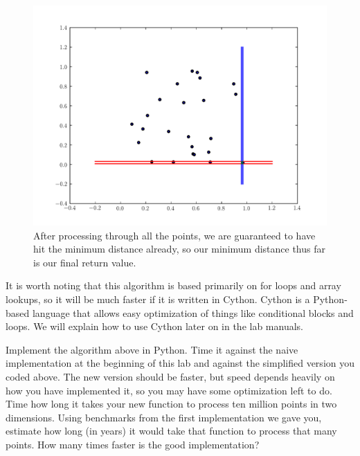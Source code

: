\begin{figure}[H]
\includegraphics[width = \textwidth]{sweep22.pdf}
\caption{After processing through all the points, we are guaranteed to have hit the minimum distance already, so our minimum distance thus far is our final return value.}
\end{figure}

It is worth noting that this algorithm is based primarily on for loops and array lookups, so it will be much faster if it is written in Cython.
Cython is a Python-based language that allows easy optimization of things like conditional blocks and loops.
We will explain how to use Cython later on in the lab manuals.

\begin{problem}
Implement the algorithm above in Python. 
Time it against the naive implementation at the beginning of this lab and against the simplified version you coded above.
The new version should be faster, but speed depends heavily on how you have implemented it, so you may have some optimization left to do.
Time how long it takes your new function to process ten million points in two dimensions. 
Using benchmarks from the first implementation we gave you, estimate how long (in years) it would take that function to process that many points.
How many times faster is the good implementation?
\end{problem}
